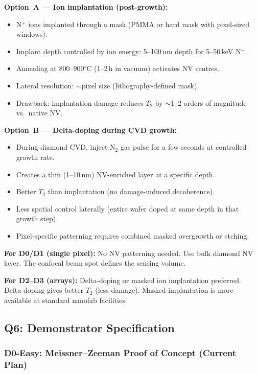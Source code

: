 \textbf{Option~A --- Ion implantation (post-growth):}
\begin{itemize}
  \item N$^+$ ions implanted through a mask (PMMA or hard mask with pixel-sized windows).
  \item Implant depth controlled by ion energy: 5--100\,nm depth for 5--50\,keV N$^+$.
  \item Annealing at 800--900$^\circ$C (1--2\,h in vacuum) activates NV centres.
  \item Lateral resolution: $\sim\!$pixel size (lithography-defined mask).
  \item Drawback: implantation damage reduces $T_2$ by $\sim$1--2 orders of magnitude
    vs.\ native NV.~\cite{Doherty2013} %
\end{itemize}

\textbf{Option~B --- Delta-doping during CVD growth:}
\begin{itemize}
  \item During diamond CVD, inject N$_2$ gas pulse for a few seconds at controlled
    growth rate.
  \item Creates a thin (1--10\,nm) NV-enriched layer at a specific depth.
  \item Better $T_2$ than implantation (no damage-induced decoherence).
  \item Less spatial control laterally (entire wafer doped at same depth in that growth step).
  \item Pixel-specific patterning requires combined masked overgrowth or etching.
\end{itemize}

\textbf{For D0/D1 (single pixel):} No NV patterning needed. Use bulk diamond NV layer.
The confocal beam spot defines the sensing volume.

\textbf{For D2--D3 (arrays):} Delta-doping or masked ion implantation preferred.
Delta-doping gives better $T_2$ (less damage). Masked implantation is more available
at standard nanofab facilities.

\subsection{Q6: Demonstrator Specification}
\label{sec:q6}

\subsubsection{D0-Easy: Meissner--Zeeman Proof of Concept (Current Plan)}
\label{sec:q6_d0easy}

